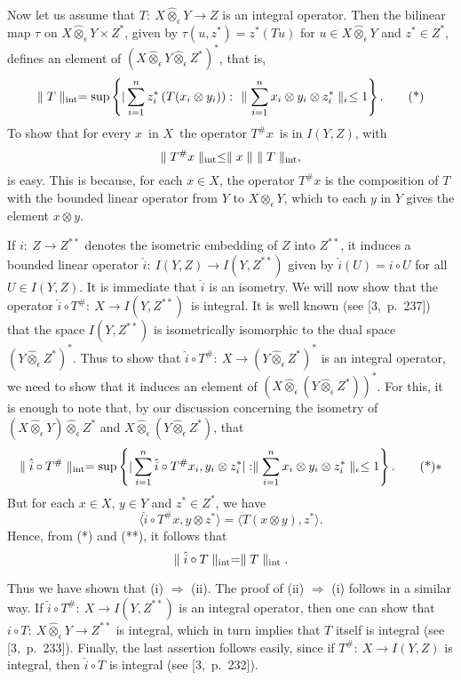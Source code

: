 \medskip

Now let us assume that $T:\ X\hat \otimes_\epsilon Y\longrightarrow
Z$ is an integral operator.  Then the bilinear map $\tau$
on $X\hat\otimes_\epsilon Y\times Z^*$, given by $\tau
(u,z^*)=z^*(Tu)$ for $u\in X\hat \otimes_\epsilon Y$ and $z^*\in Z^*$,
defines an element of $\left(X\hat \otimes_\epsilon Y\hat
\otimes_\epsilon Z^*\right)^*$, that is,
$$
\parallel 
T\parallel_{\It}=\sup\left\{|\sum\limits^n_{i=1}z_i^*\left(T(x_i\otimes
y_i)\right):\ \ \parallel\sum\limits^n_{i=1}x_i\otimes y_i \otimes
z^*_i\parallel_\epsilon \leq 1\right\} .\tag *
$$
To show that for every $x$\ in $X$\ the operator $T^\#x$\ is in 
$I(Y,Z)$, with
$$
\parallel T^\# x\parallel_{\operatorname{int}}\leq \parallel x\parallel
\ \parallel T\parallel_{\operatorname{int}} ,
$$
is easy. This is because, for each $x\in X$, the operator
$T^\#x$ is the composition of $T$ with the bounded linear operator 
from
$Y$ to $X\hat \otimes_\epsilon Y$, which to each $y$ in $Y$ gives the
element $x\otimes y$. 

\medskip

If $i:\ Z\longrightarrow Z^{**}$ denotes the
isometric embedding of $Z$ into $Z^{**}$, it induces a bounded
linear operator $\hat i:\ I(Y,Z)\longrightarrow
I(Y,Z^{**})$ given by
$\hat
i(U)=i\circ U$ for all $U\in I(Y,Z)$.  It is immediate that $\hat i$ 
is
an isometry.  We will now show that the operator $\hat i\circ T^\#:\
X\longrightarrow I(Y,Z^{**})$\ is integral. It is well known (see 
[3,~p.~237])
that the space $I(Y,Z^{**})$ is isometrically isomorphic to the dual 
space
$(Y\hat \otimes_\epsilon Z^*)^*$. Thus to show that $\hat i\circ 
T^\#:\
X\longrightarrow (Y\hat \otimes_\epsilon Z^*)^*$ is an integral 
operator, we
need to show that it induces an element of $\left(X\hat 
\otimes_\epsilon
(Y\hat \otimes_\epsilon Z^*)\right)^*$.  For this, it is enough to 
note
that, by our discussion concerning the isometry of $(X\hat
\otimes_\epsilon Y)\hat \otimes_\epsilon Z^*$ and $X\hat
\otimes_\epsilon (Y\hat \otimes_\epsilon Z^*)$, that
$$
\parallel\hat i\circ 
T^\#\parallel_{\It}=\sup\left\{|\sum\limits^n_{i=1}\hat i\circ
T^\#x_i, y_i\otimes z^*_i|:\parallel\sum\limits^n_{i=1}x_i\otimes 
y_i\otimes
z^*_i\parallel_\epsilon \leq 1\right\} .\tag **
$$
But for each $x\in X$, $y\in Y$ and $z^*\in Z^*$, we have
$$
\langle \hat i\circ T^\#x, y\otimes z^*\rangle =\langle T (x\otimes 
y),
z^*\rangle .
$$
Hence, from (*) and (**), it follows that
$$
\parallel\hat i\circ T\parallel_{\operatorname{int}}=\parallel T\parallel_{\operatorname{int}}.
$$

Thus we have shown that (i) $\Rightarrow$ (ii). The proof of (ii) 
$\Rightarrow$
(i) follows in a similar way.  If $\hat i\circ T^\#:\
X\longrightarrow I(Y,Z^{**})$ is an integral operator, then one can 
show that
$i\circ T:\ X\hat \otimes_\epsilon Y\longrightarrow Z^{**}$ is 
integral, which in
turn implies that $T$ itself is integral (see [3,~p.~233]).
\medskip
Finally, the last assertion follows easily, since if $T^\#:\
X\longrightarrow I(Y,Z)$ is integral, then $\hat i\circ T$ is integral
(see [3,~p.~232]).
\endproof

